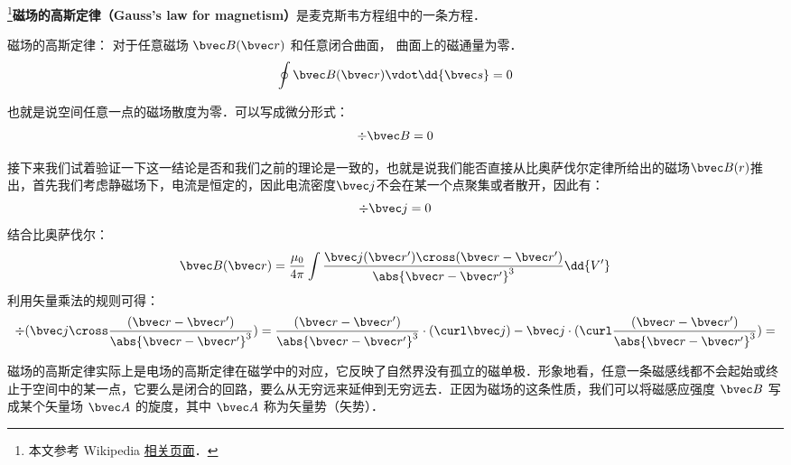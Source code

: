 
\begin{issues}
\issueDraft
\end{issues}


\footnote{本文参考 Wikipedia \href{https://en.wikipedia.org/wiki/Gauss's_law_for_magnetism}{相关页面}．}\textbf{磁场的高斯定律（Gauss's law for magnetism）}是麦克斯韦方程组中的一条方程．

磁场的高斯定律： 对于任意磁场 $\bvec B(\bvec r)$ 和任意闭合曲面， 曲面上的磁通量为零．
\begin{equation}
\oint \bvec B(\bvec r) \vdot \dd{\bvec s} = 0
\end{equation}

也就是说空间任意一点的磁场散度为零．可以写成微分形式：
\begin{equation}
\div\bvec B = 0
\end{equation}

接下来我们试着验证一下这一结论是否和我们之前的理论是一致的，也就是说我们能否直接从比奥萨伐尔定律所给出的磁场$\bvec B(r)$推出，首先我们考虑静磁场下，电流是恒定的，因此电流密度$\bvec j$不会在某一个点聚集或者散开，因此有：
\begin{equation}
\div \bvec j = 0  
\end{equation}
结合比奥萨伐尔：
\begin{equation}
\bvec B(\bvec r) = \frac{\mu_0}{4\pi} \int \frac{\bvec j(\bvec r') \cross (\bvec r - \bvec r')}{\abs{\bvec r - \bvec r'}^3} \dd{V'}
\end{equation}
利用矢量乘法的规则可得：
\begin{equation}
\div(\bvec j \cross \frac{(\bvec r - \bvec r')}{\abs{\bvec r - \bvec r'}^3})=\frac{(\bvec r - \bvec r')}{\abs{\bvec r - \bvec r'}^3}\cdot(\curl \bvec j)-\bvec j\cdot(\curl \frac{(\bvec r - \bvec r')}{\abs{\bvec r - \bvec r'}^3})=
\end{equation}


磁场的高斯定律实际上是电场的高斯定律在磁学中的对应，它反映了自然界没有孤立的磁单极．形象地看，任意一条磁感线都不会起始或终止于空间中的某一点，它要么是闭合的回路，要么从无穷远来延伸到无穷远去．正因为磁场的这条性质，我们可以将磁感应强度 $\bvec B$ 写成某个矢量场 $\bvec A$ 的旋度，其中 $\bvec A$ 称为矢量势（矢势）．